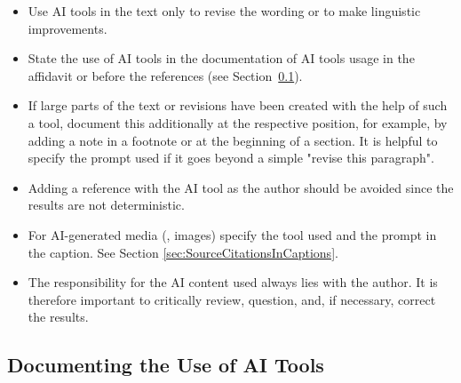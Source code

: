 \begin{itemize}
	\item Use AI tools in the text only to revise the wording or to make
	linguistic improvements.
	\item State the use of AI tools in the documentation of AI tools usage in
	the affidavit or before the references (see
	Section~\ref{sec:DocumentingAIUsage}).
	\item If large parts of the text or revisions have been created with the
	help of such a tool, document this additionally at the respective
	position, for example, by adding a note in a footnote or at the beginning
	of a section. It is helpful to specify the prompt used if it goes beyond a
	simple "revise this paragraph".
	\item Adding a reference with the AI tool as the author should be avoided
	since the results are not deterministic.
	\item For AI-generated media (\eg, images) specify the tool used and the
	prompt in the caption. See Section \ref{sec:SourceCitationsInCaptions}.
	\item The responsibility for the AI content used always lies with the
	author. It is therefore important to critically review, question, and, if
	necessary, correct the results.
\end{itemize}

\subsection{Documenting the Use of AI Tools}
\label{sec:DocumentingAIUsage}

